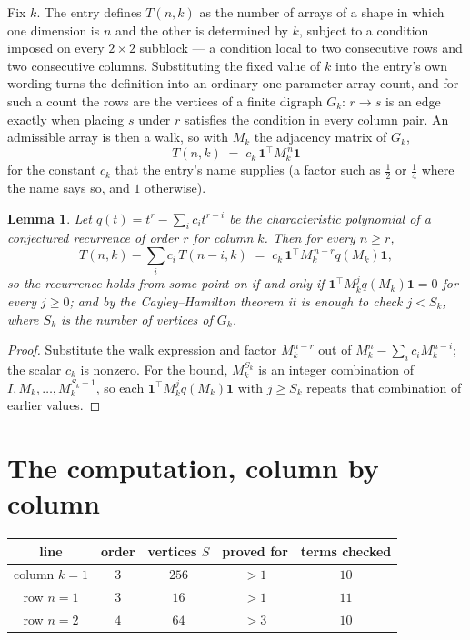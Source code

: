 \documentclass[11pt,a4paper]{article}
\theoremstyle{plain}
\newtheorem{lemma}[theorem]{Lemma}
\theoremstyle{definition}
\begin{document}
Fix $k$. The entry defines $T(n,k)$ as the number of arrays of a shape in which one dimension
is $n$ and the other is determined by $k$, subject to a condition imposed on every
$2\times2$ subblock --- a condition local to two consecutive rows and two consecutive columns.
Substituting the fixed value of $k$ into the entry's own wording turns the definition into an
ordinary one-parameter array count, and for such a count the rows are the vertices of a finite
digraph $G_k$: $r\to s$ is an edge exactly when placing $s$ under $r$ satisfies the condition
in every column pair. An admissible array is then a walk, so with $M_k$ the adjacency matrix
of $G_k$,
\[
T(n,k)\;=\;c_k\,\mathbf{1}^{\!\top}M_k^{\,n}\mathbf{1}
\]
for the constant $c_k$ that the entry's name supplies (a factor such as $\tfrac12$ or
$\tfrac14$ where the name says so, and $1$ otherwise).

\begin{lemma}\label{lem:crit}
Let $q(t)=t^{r}-\sum_i c_it^{r-i}$ be the characteristic polynomial of a conjectured
recurrence of order $r$ for column $k$. Then for every $n\ge r$,
\[
T(n,k)-\sum_i c_i\,T(n-i,k)\;=\;c_k\,\mathbf{1}^{\!\top}M_k^{\,n-r}q(M_k)\mathbf{1},
\]
so the recurrence holds from some point on if and only if
$\mathbf{1}^{\!\top}M_k^{j}q(M_k)\mathbf{1}=0$ for every $j\ge0$; and by the
Cayley--Hamilton theorem it is enough to check $j<S_k$, where $S_k$ is the number of vertices
of $G_k$.
\end{lemma}

\begin{proof}
Substitute the walk expression and factor $M_k^{n-r}$ out of $M_k^{n}-\sum_ic_iM_k^{n-i}$;
the scalar $c_k$ is nonzero. For the bound, $M_k^{S_k}$ is an integer combination of
$I,M_k,\dots,M_k^{S_k-1}$, so each $\mathbf{1}^{\!\top}M_k^{j}q(M_k)\mathbf{1}$ with
$j\ge S_k$ repeats that combination of earlier values.
\end{proof}

\section{The computation, column by column}

\begin{center}
\begin{tabular}{ccccc}
line & order & vertices $S$ & proved for & terms checked \\ \hline
column $k$$=1$ & $3$ & $256$ & $>1$ & $10$ \\
row $n$$=1$ & $3$ & $16$ & $>1$ & $11$ \\
row $n$$=2$ & $4$ & $64$ & $>3$ & $10$ \\
\end{tabular}
\end{center}
\end{document}
